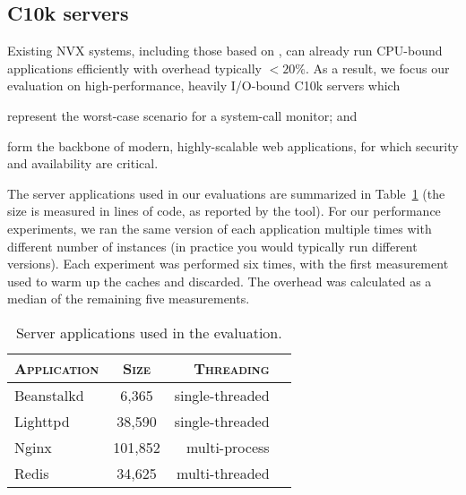 \subsection{C10k servers}
\label{sec:c10k}

Existing NVX systems, including those based on , can already
run CPU-bound applications efficiently with overhead typically $<20\%$.
As a result, we focus our evaluation on high-performance, heavily
I/O-bound C10k servers which%
\begin{inparaenum}[(1)]
\item represent the worst-case scenario for a system-call monitor; and
\item form the backbone of modern, highly-scalable web applications, for
  which security and availability are critical.
\end{inparaenum}

The \nservers server applications used in our evaluations are
summarized in Table~\ref{tbl:apps} (the size is measured in lines of
code, as reported by the  tool). For our performance experiments, we
ran the same version of each application multiple times with different number
of instances (in practice you would typically run different versions). Each
experiment was performed six times, with the first measurement used to warm up
the caches and discarded.  The overhead was calculated as a median of the
remaining five measurements.

\begin{table}
  \centering
\begin{tabular}{lcrl}
  \toprule
  \textsc{Application} & \textsc{Size} & \textsc{Threading} \\
  \midrule
  Beanstalkd & 6,365 & single-threaded \\
  Lighttpd & 38,590 & single-threaded\\
  Nginx & 101,852 & multi-process\\
  Redis & 34,625 & multi-threaded\\
  \bottomrule
\end{tabular}
  \caption{Server applications used in the evaluation.}
  \label{tbl:apps}
\end{table}


